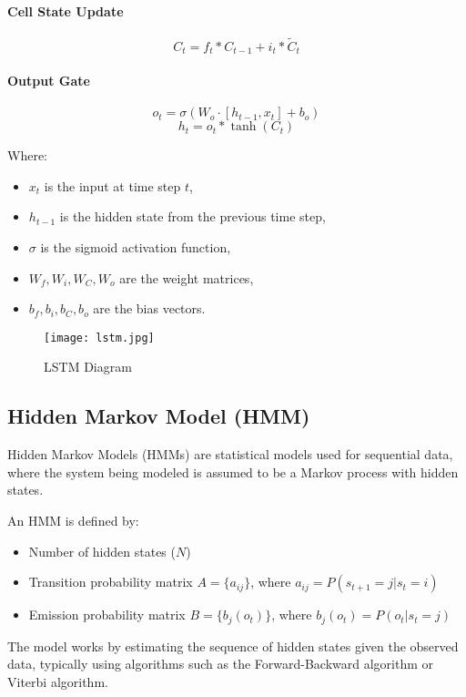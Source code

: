 \paragraph{Cell State Update}
\[
C_t = f_t * C_{t-1} + i_t * \tilde{C}_t
\]

\paragraph{Output Gate}
\[
o_t = \sigma(W_o \cdot [h_{t-1}, x_t] + b_o)
\]
\[
h_t = o_t * \tanh(C_t)
\]

Where:
\begin{itemize}
    \item \(x_t\) is the input at time step \(t\),
    \item \(h_{t-1}\) is the hidden state from the previous time step,
    \item \(\sigma\) is the sigmoid activation function,
    \item \(W_f, W_i, W_C, W_o\) are the weight matrices,
    \item \(b_f, b_i, b_C, b_o\) are the bias vectors.
\end{itemize}


\begin{figure}[h]
    \centering
    \texttt{[image: lstm.jpg]}
    \caption{LSTM Diagram}
    \label{fig:example-image}
\end{figure}



\subsection{Hidden Markov Model (HMM)}

Hidden Markov Models (HMMs) are statistical models used for sequential data, where the system being modeled is assumed to be a Markov process with hidden states.

An HMM is defined by:
\begin{itemize}
    \item Number of hidden states ($N$)
    \item Transition probability matrix $A = \{a_{ij}\}$, where $a_{ij} = P(s_{t+1}=j | s_t=i)$
    \item Emission probability matrix $B = \{b_j(o_t)\}$, where $b_j(o_t) = P(o_t | s_t=j)$
\end{itemize}

The model works by estimating the sequence of hidden states given the observed data, typically using algorithms such as the Forward-Backward algorithm or Viterbi algorithm.

